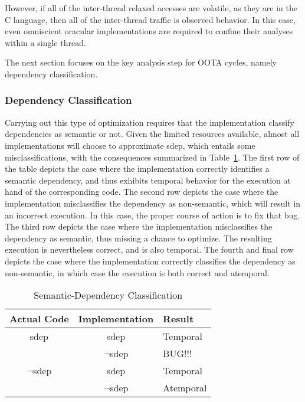 \documentclass[10]{article}
\begin{document}
However, if all of the inter-thread relaxed accesses are volatile,
as they are in the C language, then all of the inter-thread traffic is
observed behavior.
In this case, even omniscient oracular implementations are required
to confine their analyses within a single thread.

The next section focuses on the key analysis step for OOTA cycles,
namely dependency classification.

\subsubsection{Dependency Classification}
\label{sec:Dependency Classification}

Carrying out this type of optimization requires that the implementation
classify dependencies as semantic or not.
Given the limited resources available, almost all implementations will
choose to approximate sdep, which entails some misclassifications, with
the consequences summarized in
Table~\ref{tab:Semantic-Dependency Classification}.
The first row of the table depicts the case where the implementation
correctly identifies a semantic dependency, and thus exhibits temporal
behavior for the execution at hand of the corresponding code.
The second row depicts the case where the implementation misclassifies
the dependency as non-semantic, which will result in an incorrect
execution.
In this case, the proper course of action is to fix that bug.
The third row depicts the case where the implementation misclassifies
the dependency as semantic, thus missing a chance to optimize.
The resulting execution is nevertheless correct, and is also temporal.
The fourth and final row depicts the case where the implementation
correctly classifies the dependency as non-semantic, in which case
the execution is both correct and atemporal.

\begin{table}
\centering
\begin{tabular}{c|c|l}
Actual Code	& Implementation	& Result \\
\hline
sdep		& sdep			& Temporal \\
\cline{2-3}
		& $\neg$sdep		& BUG!!! \\
\hline
$\neg$sdep	& sdep			& Temporal \\
\cline{2-3}
		& $\neg$sdep		& Atemporal \\
\end{tabular}
\caption{Semantic-Dependency Classification}
\label{tab:Semantic-Dependency Classification}
\end{table}
\end{document}
